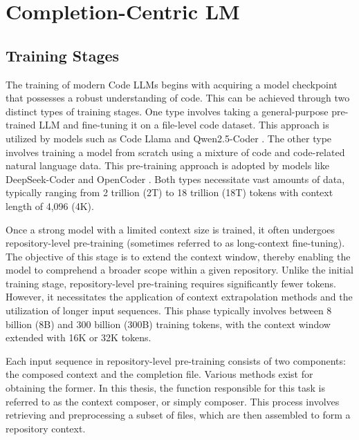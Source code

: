 \chapter{Completion-Centric LM}


\section{Training Stages}

The training of modern Code LLMs begins with acquiring a model checkpoint that possesses a robust understanding of code. This can be achieved through two distinct types of training stages. One type involves taking a general-purpose pre-trained LLM and fine-tuning it on a file-level code dataset. This approach is utilized by models such as Code Llama \parencite{rozière2023} and Qwen2.5-Coder \parencite{hui2024}. The other type involves training a model from scratch using a mixture of code and code-related natural language data. This pre-training approach is adopted by models like DeepSeek-Coder \parencite{guo2024} and OpenCoder \parencite{huang2024}. Both types necessitate vast amounts of data, typically ranging from 2 trillion (2T) to 18 trillion (18T) tokens with context length of 4,096 (4K). 

Once a strong model with a limited context size is trained, it often undergoes repository-level pre-training (sometimes referred to as long-context fine-tuning). The objective of this stage is to extend the context window, thereby enabling the model to comprehend a broader scope within a given repository. Unlike the initial training stage, repository-level pre-training requires significantly fewer tokens. However, it necessitates the application of context extrapolation methods and the utilization of longer input sequences. This phase typically involves between 8 billion (8B) and 300 billion (300B) training tokens, with the context window extended with 16K or 32K tokens.


Each input sequence in repository-level pre-training consists of two components: the composed context and the completion file. Various methods exist for obtaining the former. In this thesis, the function responsible for this task is referred to as the context composer, or simply composer. This process involves retrieving and preprocessing a subset of files, which are then assembled to form a repository context.


